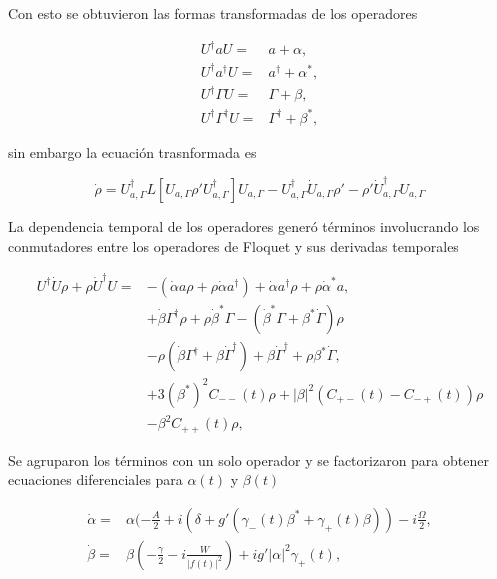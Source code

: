\documentclass[10pt]{beamer}
\begin{document}
\begin{frame}
Con esto se obtuvieron las formas transformadas de los operadores

\begin{align*}
U^{\dagger} a U =& a + \alpha, \\
U^{\dagger} a^{\dagger} U =& a^{\dagger} + \alpha^*, \\
U^{\dagger} \Gamma U =& \Gamma + \beta, \\
U^{\dagger} \Gamma^{\dagger} U =& \Gamma^{\dagger} + \beta^*, 
\end{align*} 

sin embargo la ecuación trasnformada es

\begin{equation*}
\dot{\rho} = U_{a,\Gamma}^\dagger L[U_{a,\Gamma} \rho' U_{a,\Gamma}^\dagger]U_{a,\Gamma}-U_{a,\Gamma}^\dagger\dot{U}_{a,\Gamma}\rho'-\rho'\dot{U}_{a,\Gamma}^\dagger U_{a,\Gamma}
\end{equation*}

\end{frame}

\begin{frame}
La dependencia temporal de los operadores generó términos involucrando los conmutadores entre los operadores de Floquet y sus derivadas temporales

\begin{align*}
U^{\dagger}\dot{U}\rho + \rho \dot{U}^\dagger U =& -(\dot{\alpha}a \rho + \rho\dot{\alpha}a^{\dagger}) + \dot{\alpha}a^{\dagger}\rho + \rho \dot{\alpha}^*a,\\
&+ \dot{\beta}\Gamma^{\dagger}\rho + \rho\dot{\beta}^*\Gamma-(\dot{\beta}^*\Gamma + \beta^*\dot{\Gamma})\rho  \\
&- \rho(\dot{\beta} \Gamma^{\dagger}+ \beta \dot{\Gamma}^{\dagger}) +\beta \dot{\Gamma}^{\dagger} + \rho\beta^* \dot{\Gamma},\\
&+3(\beta^*)^2C_{--}(t)\rho + |\beta|^2(C_{+-}(t) - C_{-+}(t))\rho \\
&-  \beta^2 C_{++}(t)\rho,
\end{align*}
\end{frame}

\begin{frame}
Se agruparon los términos con un solo operador y se factorizaron para obtener ecuaciones diferenciales para $\alpha(t)$ y $\beta(t)$

\begin{align*}
\dot{\alpha} =& \alpha(-\frac{A}{2}+i(\delta+g'(\gamma_-(t) \beta^* + \gamma_+(t) \beta))-i\frac{\Omega}{2},\\
\dot{\beta} =& \beta(-\frac{\gamma}{2}-i\frac{W}{|f(t)|^2})+ig'|\alpha|^2\gamma_+(t),
\end{align*}
\end{frame}
\end{document}
